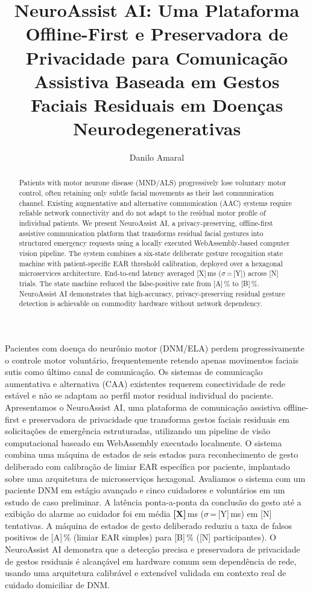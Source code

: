 \documentclass[12pt]{article}
\title{NeuroAssist AI: Uma Plataforma Offline-First e Preservadora de Privacidade
para Comunicação Assistiva Baseada em Gestos Faciais Residuais
em Doenças Neurodegenerativas}
\author{Danilo Amaral\inst{1}}
\begin{document}
\maketitle

\begin{resumo}
Pacientes com doença do neurônio motor (DNM/ELA) perdem progressivamente o controle
motor voluntário, frequentemente retendo apenas movimentos faciais sutis como último
canal de comunicação. Os sistemas de comunicação aumentativa e alternativa (CAA)
existentes requerem conectividade de rede estável e não se adaptam ao perfil motor
residual individual do paciente. Apresentamos o NeuroAssist AI, uma plataforma de
comunicação assistiva offline-first e preservadora de privacidade que transforma
gestos faciais residuais em solicitações de emergência estruturadas, utilizando um
pipeline de visão computacional baseado em WebAssembly executado localmente. O
sistema combina uma máquina de estados de seis estados para reconhecimento de gesto
deliberado com calibração de limiar EAR específica por paciente, implantado sobre
uma arquitetura de microsserviços hexagonal. Avaliamos o sistema com um paciente
DNM em estágio avançado e cinco cuidadores e voluntários em um estudo de caso
preliminar. A latência ponta-a-ponta da conclusão do gesto até a exibição do alarme
ao cuidador foi em média \textbf{[X]}\,ms ($\sigma$\,=\,[Y]\,ms) em [N] tentativas.
A máquina de estados de gesto deliberado reduziu a taxa de falsos positivos de
[A]\,\% (limiar EAR simples) para [B]\,\% ([N] participantes). O NeuroAssist AI
demonstra que a detecção precisa e preservadora de privacidade de gestos residuais
é alcançável em hardware comum sem dependência de rede, usando uma arquitetura
calibrável e extensível validada em contexto real de cuidado domiciliar de DNM.
\end{resumo}

\begin{abstract}
Patients with motor neurone disease (MND/ALS) progressively lose voluntary motor
control, often retaining only subtle facial movements as their last communication
channel. Existing augmentative and alternative communication (AAC) systems require
reliable network connectivity and do not adapt to the residual motor profile of
individual patients. We present NeuroAssist AI, a privacy-preserving, offline-first
assistive communication platform that transforms residual facial gestures into
structured emergency requests using a locally executed WebAssembly-based computer
vision pipeline. The system combines a six-state deliberate gesture recognition
state machine with patient-specific EAR threshold calibration, deployed over a
hexagonal microservices architecture. End-to-end latency averaged [X]\,ms
($\sigma$\,=\,[Y]) across [N] trials. The state machine reduced the false-positive
rate from [A]\,\% to [B]\,\%. NeuroAssist AI demonstrates that high-accuracy,
privacy-preserving residual gesture detection is achievable on commodity hardware
without network dependency.
\end{abstract}
\end{document}
